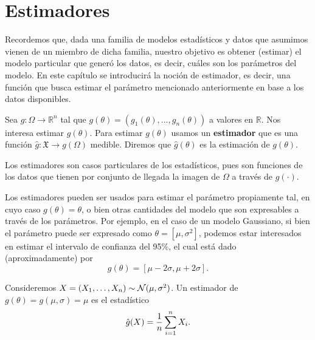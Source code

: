 \chapter{Estimadores}
Recordemos que, dada una familia de modelos estadísticos y datos que asumimos vienen de un miembro de dicha familia, nuestro objetivo es obtener (estimar) el modelo particular que generó los datos, es decir, cuáles son los parámetros del modelo. En este capítulo se introducirá la noción de estimador, es decir, una función que busca estimar el parámetro mencionado anteriormente en base a los datos disponibles.

\begin{definition}
    Sea $g:\Omega\rightarrow \mathbb{R}^n$  tal que $g(\theta) = (g_1(\theta),...,g_n(\theta))$ a valores en $\mathbb{R}$. Nos interesa estimar $g(\theta)$. Para estimar $g(\theta)$ usamos un \textbf{estimador} que es una función $\hat{g}:\mathfrak{X}\rightarrow g(\Omega)$ medible. Diremos que $\hat{g}(\theta)$ es la estimación de $g(\theta)$.
    
\end{definition}

\begin{remark}
    Los estimadores son casos particulares de los estadísticos, pues son funciones de los datos que tienen por conjunto de llegada la imagen de $\Omega$ a través de $g(\cdot)$.
\end{remark}

\begin{remark}
    Los estimadores pueden ser usados para estimar el parámetro propiamente tal, en cuyo caso $g(\theta)=\theta$, o bien otras cantidades del modelo que son expresables a través de los parámetros. Por ejemplo, en el caso de un modelo Gaussiano, si bien el parámetro puede ser expresado como $\theta = [\mu,\sigma^2]$, podemos estar interesados en estimar el intervalo de confianza del 95\%, el cual está dado (aproximadamente) por 
    \begin{equation}
        g(\theta) = [\mu - 2\sigma,\mu + 2\sigma].
    \end{equation}
\end{remark}

\begin{example}
	\label{ex:estimador_media}
	Consideremos $X = (X_1,\ldots,X_n)\sim{\mathcal N}(\mu,\sigma^2)$. Un estimador de $g(\theta) = g(\mu,\sigma) = \mu$ es el estadístico 
	\begin{equation}
	\nonumber
		{ \hat{g}}(X) = \frac{1}{n}\sum_{i=1}^nX_i.
	\end{equation} 
\end{example}



